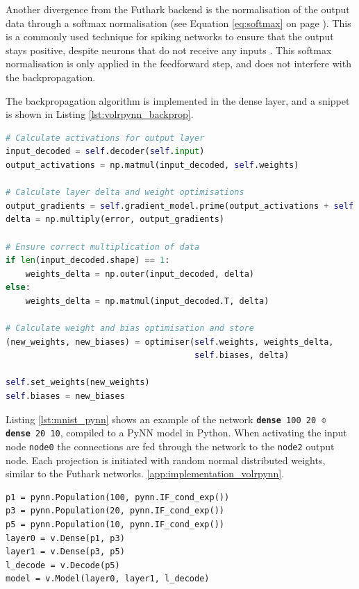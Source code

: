Another divergence from the Futhark backend is the normalisation of the
output data through a softmax normalisation
(see Equation \ref{eq:softmax} on page \pageref{eq:softmax}).
This is a commonly used technique for spiking networks to ensure that the 
output stays positive, despite neurons that do not receive any inputs 
\cite{Rueckauer2017}.
This softmax normalisation is only applied in the feedforward step, and does
not interfere with the backpropagation.

The backpropagation algorithm is implemented in the dense layer, and a snippet
is shown in Listing \ref{lst:volrpynn_backprop}.

\begin{lstlisting}[language=Python,label={lst:volrpynn_backprop},caption={Part
of the backpropagation algorithm implemented in PyNN.}]
# Calculate activations for output layer
input_decoded = self.decoder(self.input)
output_activations = np.matmul(input_decoded, self.weights)

# Calculate layer delta and weight optimisations
output_gradients = self.gradient_model.prime(output_activations + self.biases)
delta = np.multiply(error, output_gradients)

# Ensure correct multiplication of data
if len(input_decoded.shape) == 1:
    weights_delta = np.outer(input_decoded, delta)
else:
    weights_delta = np.matmul(input_decoded.T, delta)

# Calculate weight and bias optimisation and store
(new_weights, new_biases) = optimiser(self.weights, weights_delta,
                                      self.biases, delta)

self.set_weights(new_weights)
self.biases = new_biases
\end{lstlisting}

Listing \ref{lst:mnist_pynn} shows an example of the network
\texttt{\textbf{dense} 100 20 $\obar$ \textbf{dense} 20 10}, compiled to a PyNN model in Python.
When activating the input node \texttt{node0} the connections are fed through
the network to the \texttt{node2} output node.
Each projection is initiated with random normal distributed weights, similar
to the Futhark networks.
\ref{app:implementation_volrpynn}.

\begin{lstlisting}[caption={A simple MNIST network in the PyNN backend from the network in figure
    \ref{fig:volr-examples} on page \pageref{fig:volr-examples}.
    The neuron parameters for the LIF populations have been
omitted.},label={lst:mnist_pynn}]
p1 = pynn.Population(100, pynn.IF_cond_exp())
p3 = pynn.Population(20, pynn.IF_cond_exp())
p5 = pynn.Population(10, pynn.IF_cond_exp())
layer0 = v.Dense(p1, p3)
layer1 = v.Dense(p3, p5)
l_decode = v.Decode(p5)
model = v.Model(layer0, layer1, l_decode)
\end{lstlisting}


